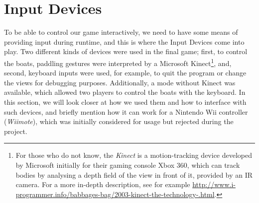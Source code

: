 \section{Input Devices}

To be able to control our game interactively, we need to have some means of providing input during runtime, and this is where the Input Devices come into play. Two different kinds of devices were used in the final game; first, to control the boats, paddling gestures were interpreted by a Microsoft Kinect\footnote{For those who do not know, the \emph{Kinect} is a motion-tracking device developed by Microsoft initially for their gaming console Xbox 360, which can track bodies by analysing a depth field of the view in front of it, provided by an IR camera. For a more in-depth description, see for example \url{http://www.i-programmer.info/babbages-bag/2003-kinect-the-technology-.html}.}, and, second, keyboard inputs were used, for example, to quit the program or change the views for debugging purposes. Additionally, a mode without Kinect was available, which allowed two players to control the boats with the keyboard. In this section, we will look closer at how we used them and how to interface with such devices, and briefly mention how it can work for a Nintendo Wii controller (\emph{Wiimote}), which was initially considered for usage but rejected during the project.


